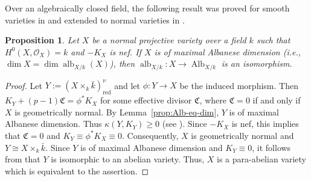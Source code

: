 \documentclass[10pt,abstract=true]{scrartcl}
\numberwithin{equation}{section}
\newtheorem{proposition}[theorem]{Proposition}
\theoremstyle{definition}
\theoremstyle{remark}
\DeclareMathOperator\Alb{Alb}
\DeclareMathOperator\alb{alb}
\begin{document}
Over an algebraically closed field, the following result was proved for smooth varieties in \cite[Theorem~0.3]{HPZ19} and extended to normal varieties in \cite[Proposition~2.3]{EP23}.
\begin{proposition}\label{prop:GV0U}%
  Let $X$ be a normal projective variety over a field $k$ such that $H^0(X,\mathcal O_X) = k$ and $-K_X$ is nef.
  If $X$ is of maximal Albanese dimension (i.e., $\dim X = \dim\alb_{X/k}(X)$), then $\alb_{X/k}\colon X\to \Alb_{X/k}$ is an isomorphism.
\end{proposition}
\begin{proof}
  Let $Y:= (X \times_k \bar k)^\nu_{\mathrm{red}}$ and let $\phi\colon Y\to X$ be the induced morphism.
  Then $K_Y + (p-1) \mathfrak C = \phi^*K_X$ for some effective divisor $\mathfrak C$, where $\mathfrak C=0$ if and only if $X$ is geometrically normal.
  By Lemma~\ref{prop:Alb-eq-dim}, $Y$ is of maximal Albanese dimension.
  Thus $\kappa(Y,K_Y) \ge 0$ (see \cite[Proposition~2.9 (1)]{CWZ-cbf}).
  Since $-K_X$ is nef, this implies that $\mathfrak C = 0$ and $K_Y \equiv \phi^*K_X \equiv 0$.
  Consequently, $X$ is geometrically normal and $Y \cong X\times_k \bar k$.
  Since $Y$ is of maximal Albanese dimension and $K_Y \equiv 0$, it follows from \cite[Proposition~2.3]{EP23} that $Y$ is isomorphic to an abelian variety.
  Thus, $X$ is a para-abelian variety which is equivalent to the assertion.
\end{proof}
\end{document}
